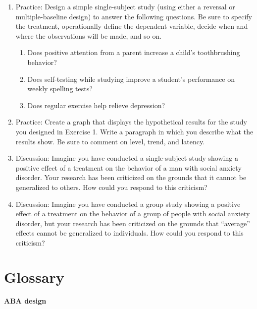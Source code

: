 \documentclass[
]{krantz}
\providecommand{\tightlist}{%
  \setlength{\itemsep}{0pt}\setlength{\parskip}{0pt}}
\begin{document}
\begin{enumerate}
\def\labelenumi{\arabic{enumi}.}
\tightlist
\item
  Practice: Design a simple single-subject study (using either a reversal or multiple-baseline design) to answer the following questions. Be sure to specify the treatment, operationally define the dependent variable, decide when and where the observations will be made, and so on.

  \begin{enumerate}
  \def\labelenumii{\alph{enumii}.}
  \tightlist
  \item
    Does positive attention from a parent increase a child's toothbrushing behavior?
  \item
    Does self-testing while studying improve a student's performance on weekly spelling tests?
  \item
    Does regular exercise help relieve depression?
  \end{enumerate}
\item
  Practice: Create a graph that displays the hypothetical results for the study you designed in Exercise 1. Write a paragraph in which you describe what the results show. Be sure to comment on level, trend, and latency.
\item
  Discussion: Imagine you have conducted a single-subject study showing a positive effect of a treatment on the behavior of a man with social anxiety disorder. Your research has been criticized on the grounds that it cannot be generalized to others. How could you respond to this criticism?
\item
  Discussion: Imagine you have conducted a group study showing a positive effect of a treatment on the behavior of a group of people with social anxiety disorder, but your research has been criticized on the grounds that ``average'' effects cannot be generalized to individuals. How could you respond to this criticism?
\end{enumerate}

\section{Glossary}\label{glossary-6}

\paragraph*{ABA design}\label{aba-design}
\end{document}

